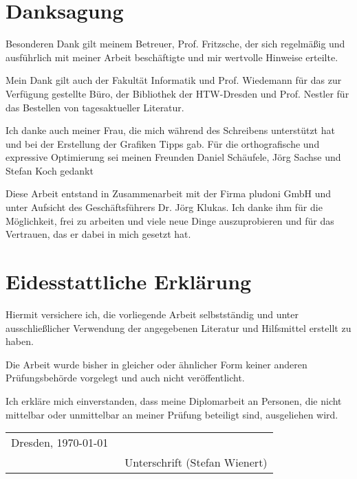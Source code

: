 \tableofcontents		%
\newpage
\chapter*{Danksagung}

Besonderen Dank gilt meinem Betreuer, Prof. Fritzsche, der sich regelmäßig und ausführlich mit meiner Arbeit beschäftigte und mir wertvolle Hinweise erteilte.

Mein Dank gilt auch der Fakultät Informatik und Prof. Wiedemann für das zur Verfügung gestellte Büro, der Bibliothek der HTW-Dresden und Prof. Nestler für das Bestellen von tagesaktueller Literatur.

Ich danke auch meiner Frau, die mich während des Schreibens unterstützt hat und bei der Erstellung der Grafiken Tipps gab. Für die orthografische und expressive Optimierung sei meinen Freunden Daniel Schäufele, Jörg Sachse und Stefan Koch gedankt

Diese Arbeit entstand in Zusammenarbeit mit der Firma pludoni GmbH und unter Aufsicht des Geschäftsführers Dr. Jörg Klukas. Ich danke ihm für die Möglichkeit, frei zu arbeiten und viele neue Dinge auszuprobieren und für das Vertrauen, das er dabei in mich gesetzt hat.

\newpage
\chapter*{Eidesstattliche Erklärung}
	Hiermit versichere ich, die vorliegende Arbeit selbstständig und unter ausschließlicher Verwendung
	der angegebenen Literatur und Hilfsmittel erstellt zu haben.

	Die Arbeit wurde bisher in gleicher oder ähnlicher Form keiner anderen Prüfungsbehörde vorgelegt
	und auch nicht veröffentlicht.\bigskip

Ich erkläre mich einverstanden, dass meine Diplomarbeit an Personen, die nicht mittelbar oder unmittelbar an meiner Prüfung beteiligt sind, ausgeliehen wird.\bigskip

\begin{tabular}{ll}

	Dresden, \today & \underline{\qquad \qquad \qquad \qquad \qquad \qquad}\\
	& \small{\ Unterschrift (Stefan Wienert)}
\end{tabular}


